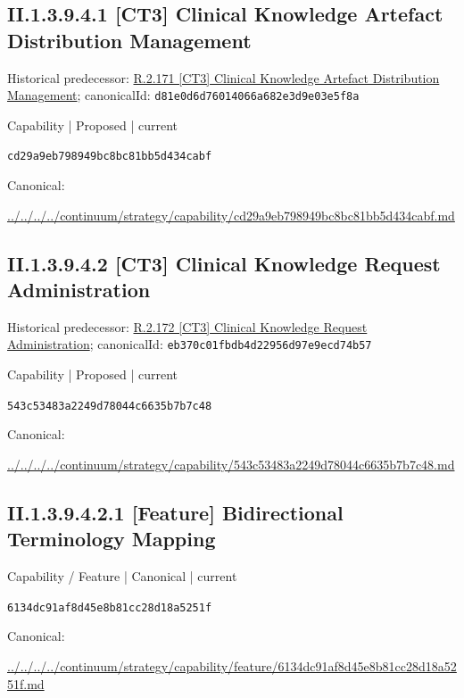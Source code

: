 \documentclass[10pt,a4paper]{article}
\begin{document}
\subsection*{II.1.3.9.4.1 [CT3] Clinical Knowledge Artefact Distribution Management}
Historical predecessor: \hyperref[element-d81e0d6d76014066a682e3d9e03e5f8a]{R.2.171 [CT3] Clinical Knowledge Artefact Distribution Management}; canonicalId: \texttt{d81e0d6d76014066a682e3d9e03e5f8a}\par
\label{element-cd29a9eb798949bc8bc81bb5d434cabf}
{\small Capability | Proposed | current}\par
\texttt{cd29a9eb798949bc8bc81bb5d434cabf}\par
Canonical: \par
{\footnotesize\url{../../../../continuum/strategy/capability/cd29a9eb798949bc8bc81bb5d434cabf.md}}\par
\subsection*{II.1.3.9.4.2 [CT3] Clinical Knowledge Request Administration}
Historical predecessor: \hyperref[element-eb370c01fbdb4d22956d97e9ecd74b57]{R.2.172 [CT3] Clinical Knowledge Request Administration}; canonicalId: \texttt{eb370c01fbdb4d22956d97e9ecd74b57}\par
\label{element-543c53483a2249d78044c6635b7b7c48}
{\small Capability | Proposed | current}\par
\texttt{543c53483a2249d78044c6635b7b7c48}\par
Canonical: \par
{\footnotesize\url{../../../../continuum/strategy/capability/543c53483a2249d78044c6635b7b7c48.md}}\par
\subsection*{II.1.3.9.4.2.1 [Feature] Bidirectional Terminology Mapping}
\label{element-6134dc91af8d45e8b81cc28d18a5251f}
{\small Capability / Feature | Canonical | current}\par
\texttt{6134dc91af8d45e8b81cc28d18a5251f}\par
Canonical: \par
{\footnotesize\url{../../../../continuum/strategy/capability/feature/6134dc91af8d45e8b81cc28d18a5251f.md}}\par
\end{document}
